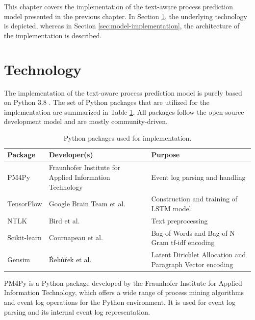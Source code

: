 This chapter covers the implementation of the text-aware process prediction model presented in the previous chapter.
In Section \ref{sec:technology}, the underlying technology is depicted, whereas in Section \ref{sec:model-implementation}, the architecture of the implementation is described.

\section{Technology}\label{sec:technology}

The implementation of the text-aware process prediction model is purely based on Python 3.8 \cite{python}.
The set of Python packages that are utilized for the implementation are summarized in Table \ref{tab:packages}.
All packages follow the open-source development model and are mostly community-driven.

\begin{table}[!htbp]
	\begin{tabularx}{\textwidth}{l p{4.5cm} p{6.6cm} }
		\toprule
		\textbf{Package} & \textbf{Developer(s)} & \textbf{Purpose}  \\
		\midrule
		PM4Py \cite{DBLP:journals/corr/abs-1905-06169}   &  Fraunhofer Institute for Applied Information Technology &  Event log parsing and handling\\
		TensorFlow \cite{DBLP:journals/corr/AbadiABBCCCDDDG16} &  Google Brain Team et al.& Construction and training of LSTM model \\
		NTLK \cite{DBLP:books/daglib/0022921} & Bird et al. & Text preprocessing\\
		Scikit-learn \cite{DBLP:journals/jmlr/PedregosaVGMTGBPWDVPCBPD11} & Cournapeau et al.& Bag of Words and Bag of N-Gram tf-idf encoding \\
		Gensim \cite{rehurek_lrec} & Řehůřek et al. & Latent Dirichlet Allocation and Paragraph Vector encoding \\
		 \bottomrule
	\end{tabularx}
	\caption[Python packages used for implementation]{Python packages used for implementation.}
	\label{tab:packages}
\end{table}

PM4Py \cite{DBLP:journals/corr/abs-1905-06169} is a Python package developed by the Fraunhofer Institute for Applied Information Technology, which offers a wide range of process mining algorithms and event log operations for the Python environment.
It is used for event log parsing and its internal event log representation.

